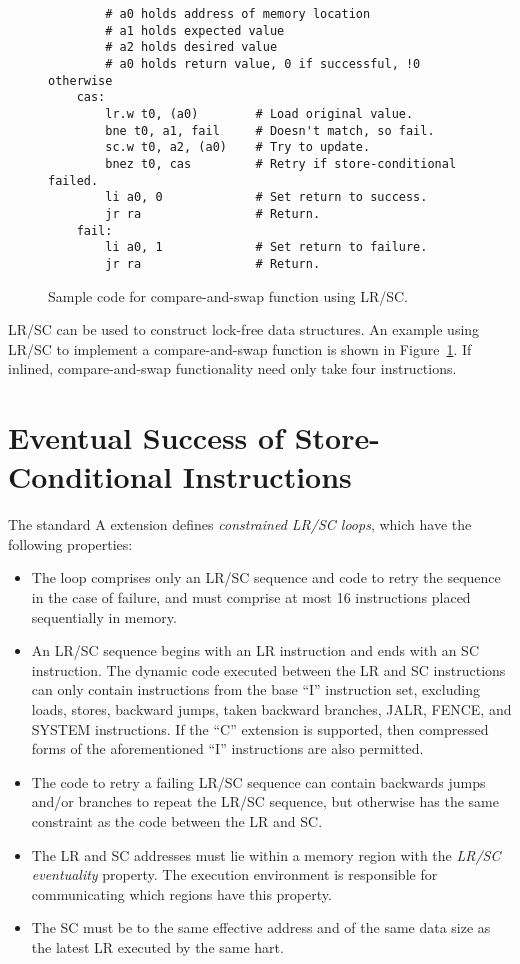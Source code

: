 \begin{figure}[h!]
\begin{center}
\begin{verbatim}
        # a0 holds address of memory location
        # a1 holds expected value
        # a2 holds desired value
        # a0 holds return value, 0 if successful, !0 otherwise
    cas:
        lr.w t0, (a0)        # Load original value.
        bne t0, a1, fail     # Doesn't match, so fail.
        sc.w t0, a2, (a0)    # Try to update.
        bnez t0, cas         # Retry if store-conditional failed.
        li a0, 0             # Set return to success.
        jr ra                # Return.
    fail:
        li a0, 1             # Set return to failure.
        jr ra                # Return.
\end{verbatim}
\end{center}
\caption{Sample code for compare-and-swap function using LR/SC.}
\label{cas}
\end{figure}

LR/SC can be used to construct lock-free data structures.  An example
using LR/SC to implement a compare-and-swap function is shown in
Figure~\ref{cas}.  If inlined, compare-and-swap functionality need
only take four instructions.

\section{Eventual Success of Store-Conditional Instructions}
\label{sec:lrscseq}

The standard A extension defines {\em constrained LR/SC loops}, which have
the following properties:
\vspace{-0.2in}
\begin{itemize}
\parskip 0pt
\itemsep 1pt
\item The loop comprises only an LR/SC sequence and code to retry the sequence
  in the case of failure, and must comprise at most 16 instructions placed
  sequentially in memory.
\item An LR/SC sequence begins with an LR instruction and ends with an SC
  instruction.  The dynamic code executed between the LR and SC instructions
  can only contain instructions from the base ``I'' instruction set, excluding
  loads, stores, backward jumps, taken backward branches, JALR, FENCE,
  and SYSTEM instructions.
  If the ``C'' extension is supported, then compressed
  forms of the aforementioned ``I'' instructions are also permitted.
\item The code to retry a failing LR/SC sequence can contain backwards jumps
  and/or branches to repeat the LR/SC sequence, but otherwise has the same
  constraint as the code between the LR and SC.
\item The LR and SC addresses must lie within a memory region with the
  {\em LR/SC eventuality} property.  The execution environment is responsible
  for communicating which regions have this property.
\item The SC must be to the same effective address and of the same data size as
  the latest LR executed by the same hart.
\end{itemize}

